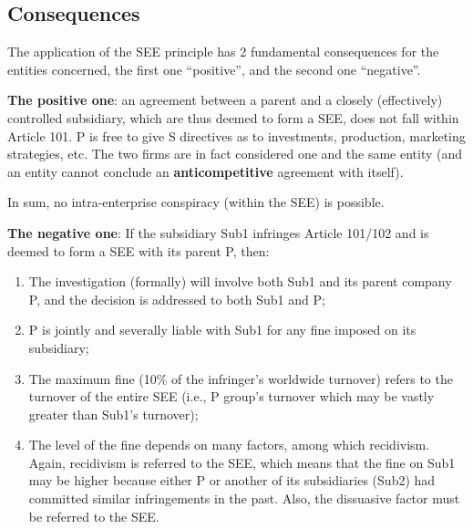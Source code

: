     \subsection{Consequences}

        The application of the SEE principle has 2 fundamental consequences for the entities concerned, the first one “positive”, and the second one “negative”.
        
        \textbf{The positive one}: an agreement between a parent and a closely (effectively) controlled subsidiary, which are thus deemed to form a SEE, does not fall within Article 101. P is free to give S directives as to investments, production, marketing strategies, etc. The two firms are in fact considered one and the same entity (and an entity cannot conclude an \textbf{anticompetitive} agreement with itself).
        
        In sum, no intra-enterprise conspiracy (within the SEE) is possible.
        
        \textbf{The negative one}: If the subsidiary Sub1 infringes Article 101/102 and is deemed to form a SEE with its parent P, then:
        \begin{enumerate}[label=(\alph*)]
            \item The investigation (formally) will involve both Sub1 and its parent company P, and the decision is addressed to both Sub1 and P;
            \item P is jointly and severally liable with Sub1 for any fine imposed on its subsidiary;
            \item The maximum fine (10\% of the infringer’s worldwide turnover) refers to the turnover of the entire SEE (i.e., P group’s turnover which may be vastly greater than Sub1's turnover);
            \item The level of the fine depends on many factors, among which recidivism. Again, recidivism is referred to the SEE, which means that the fine on Sub1 may be higher because either P or another of its subsidiaries (Sub2) had committed similar infringements in the past. Also, the dissuasive factor must be referred to the SEE.
        \end{enumerate}
        
        
